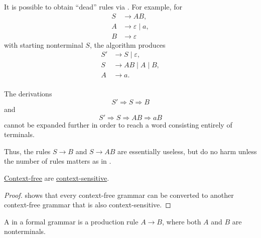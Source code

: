 \begin{example}
\begin{thmenum}
     It is possible to obtain \enquote{dead} rules via . For example, for
    \begin{equation*}
      \begin{aligned}
        S &\to A B, \\
        A &\to \varepsilon \mid a, \\
        B &\to \varepsilon
      \end{aligned}
    \end{equation*}
    with starting nonterminal \( S \), the algorithm produces
    \begin{equation*}
      \begin{aligned}
        S' &\to S \mid \varepsilon, \\
        S &\to A B \mid A \mid B, \\
        A &\to a. \\
      \end{aligned}
    \end{equation*}

    The derivations
    \begin{equation*}
      S' \Rightarrow S \Rightarrow B
    \end{equation*}
    and
    \begin{equation*}
      S' \Rightarrow S \Rightarrow A B \Rightarrow a B
    \end{equation*}
    cannot be expanded further in order to reach a word consisting entirely of terminals.

    Thus, the rules \( S \to B \) and \( S \to A B \) are essentially useless, but do no harm unless the number of rules matters as in .
  \end{thmenum}
\end{example}

\begin{proposition}\label{thm:context_free_languages_are_context_sensitive}
  \hyperref[def:chomsky_hierarchy/context_free]{Context-free}  are \hyperref[def:chomsky_hierarchy/context_sensitive]{context-sensitive}.
\end{proposition}
\begin{proof}
   shows that every context-free grammar can be converted to another context-free grammar that is also context-sensitive.
\end{proof}

\begin{definition}\label{def:renaming_rule}\mimprovised
  A  in a formal grammar is a production rule \( A \to B \), where both \( A \) and \( B \) are nonterminals.
\end{definition}

